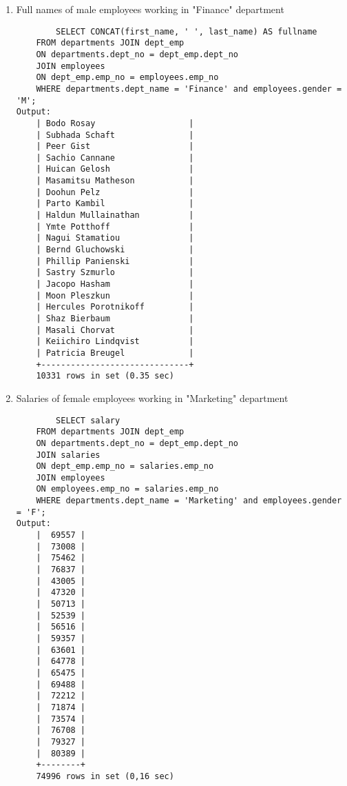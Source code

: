 \documentclass[12pt, letterpaper, twoside]{article}
\begin{document}
\begin{enumerate}
		\item Full names of male employees working in "Finance"
department
		\begin{verbatim}
		SELECT CONCAT(first_name, ' ', last_name) AS fullname
	FROM departments JOIN dept_emp 
	ON departments.dept_no = dept_emp.dept_no
	JOIN employees
	ON dept_emp.emp_no = employees.emp_no
	WHERE departments.dept_name = 'Finance' and employees.gender = 'M';
Output:
	| Bodo Rosay                   |
	| Subhada Schaft               |
	| Peer Gist                    |
	| Sachio Cannane               |
	| Huican Gelosh                |
	| Masamitsu Matheson           |
	| Doohun Pelz                  |
	| Parto Kambil                 |
	| Haldun Mullainathan          |
	| Ymte Potthoff                |
	| Nagui Stamatiou              |
	| Bernd Gluchowski             |
	| Phillip Panienski            |
	| Sastry Szmurlo               |
	| Jacopo Hasham                |
	| Moon Pleszkun                |
	| Hercules Porotnikoff         |
	| Shaz Bierbaum                |
	| Masali Chorvat               |
	| Keiichiro Lindqvist          |
	| Patricia Breugel             |
	+------------------------------+
	10331 rows in set (0.35 sec)

		\end{verbatim}
		
		\item Salaries of female employees working in "Marketing"
department
		\begin{verbatim}
		SELECT salary
	FROM departments JOIN dept_emp 
	ON departments.dept_no = dept_emp.dept_no
	JOIN salaries
	ON dept_emp.emp_no = salaries.emp_no
	JOIN employees
	ON employees.emp_no = salaries.emp_no
	WHERE departments.dept_name = 'Marketing' and employees.gender = 'F';
Output:
	|  69557 |
	|  73008 |
	|  75462 |
	|  76837 |
	|  43005 |
	|  47320 |
	|  50713 |
	|  52539 |
	|  56516 |
	|  59357 |
	|  63601 |
	|  64778 |
	|  65475 |
	|  69488 |
	|  72212 |
	|  71874 |
	|  73574 |
	|  76708 |
	|  79327 |
	|  80389 |
	+--------+
	74996 rows in set (0,16 sec)
		\end{verbatim}
		

\end{enumerate}
\end{document}
